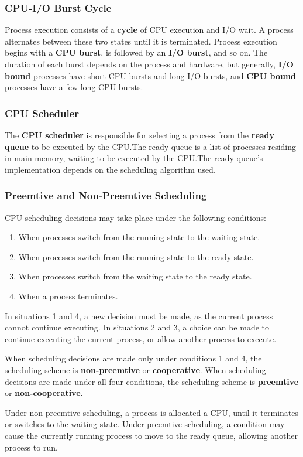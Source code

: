 \documentclass{article}
\begin{document}
\subsubsection{CPU-I/O Burst Cycle}
Process execution consists of a \textbf{cycle} of CPU execution and I/O
wait. A process alternates between these two states until it is
terminated. Process execution begins with a \textbf{CPU burst}, is
followed by an \textbf{I/O burst}, and so on. The duration of each
burst depends on the process and hardware, but generally, \textbf{I/O
bound} processes have short CPU bursts and long I/O bursts, and
\textbf{CPU bound} processes have a few long CPU bursts.
\subsubsection{CPU Scheduler}
The \textbf{CPU scheduler} is responsible for selecting a process from
the \textbf{ready queue} to be executed by the CPU.\@ The ready queue
is a list of processes residing in main memory, waiting to be executed
by the CPU.\@ The ready queue's implementation depends on the
scheduling algorithm used.
\subsubsection{Preemtive and Non-Preemtive Scheduling}
CPU scheduling decisions may take place under the following conditions:
\begin{enumerate}
    \item When processes switch from the running state to the waiting
          state.
    \item When processes switch from the running state to the ready
          state.
    \item When processes switch from the waiting state to the ready
          state.
    \item When a process terminates.
\end{enumerate}
In situations 1 and 4, a new decision must be made, as the current process
cannot continue executing. In situations 2 and 3, a choice can be made
to continue executing the current process, or allow another process to
execute.

When scheduling decisions are made only under conditions 1 and 4, the
scheduling scheme is \textbf{non-preemtive} or \textbf{cooperative}.
When scheduling decisions are made under all four conditions, the
scheduling scheme is \textbf{preemtive} or \textbf{non-cooperative}.

Under non-preemtive scheduling, a process is allocated a CPU, until it
terminates or switches to the waiting state. Under preemtive
scheduling, a condition may cause the currently running process to move
to the ready queue, allowing another process to run.
\end{document}

